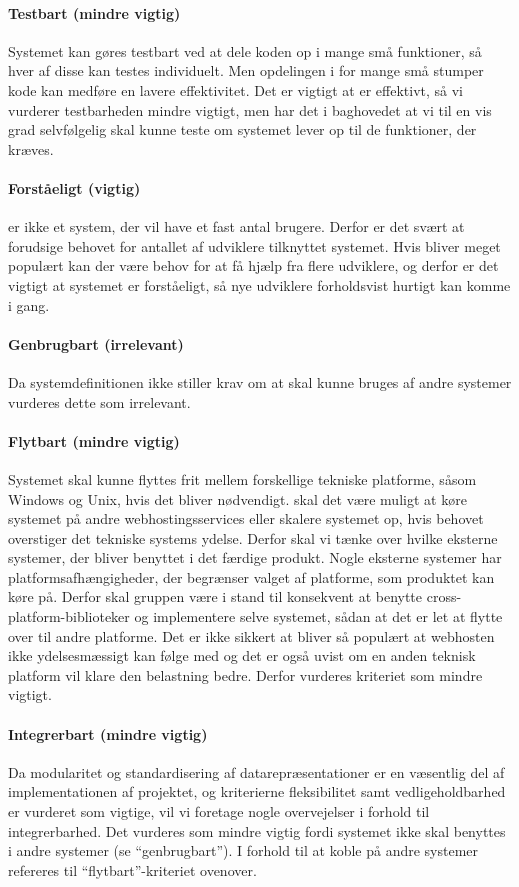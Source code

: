 \paragraph{Testbart (mindre vigtig)} 
Systemet kan gøres testbart ved at dele koden op i mange små funktioner, så hver af disse kan testes individuelt. Men opdelingen i for mange små stumper kode kan medføre en lavere effektivitet. Det er vigtigt at \Foodl{} er effektivt, så vi vurderer testbarheden mindre vigtigt, men har det i baghovedet at vi til en vis grad selvfølgelig skal kunne teste om systemet lever op til de funktioner, der kræves.

\paragraph{Forståeligt (vigtig)} 
\Foodl{} er ikke et system, der vil have et fast antal brugere. Derfor er det svært at forudsige behovet for antallet af udviklere tilknyttet systemet. Hvis \Foodl{} bliver meget populært kan der være behov for at få hjælp fra flere udviklere, og derfor er det vigtigt at systemet er forståeligt, så nye udviklere forholdsvist hurtigt kan komme i gang.

\paragraph{Genbrugbart (irrelevant)} 
Da systemdefinitionen ikke stiller krav om at \Foodl{} skal kunne bruges af andre systemer vurderes dette som irrelevant.

\paragraph{Flytbart (mindre vigtig)} 
Systemet skal kunne flyttes frit mellem forskellige tekniske platforme, såsom Windows og Unix, hvis det bliver nødvendigt. \Fx skal det være muligt at køre systemet på andre webhostingsservices eller skalere systemet op, hvis behovet overstiger det tekniske systems ydelse. Derfor skal vi tænke over hvilke eksterne systemer, der bliver benyttet i det færdige produkt. Nogle eksterne systemer har platformsafhængigheder, der begrænser valget af platforme, som produktet kan køre på. Derfor skal gruppen være i stand til konsekvent at benytte cross-platform-biblioteker og implementere selve systemet, sådan at det er let at flytte over til andre platforme. Det er ikke sikkert at \Foodl{} bliver så populært at webhosten ikke ydelsesmæssigt kan følge med og det er også uvist om en anden teknisk platform vil klare den belastning bedre. Derfor vurderes kriteriet som mindre vigtigt.

\paragraph{Integrerbart (mindre vigtig)} 
Da modularitet og standardisering af datarepræsentationer er en væsentlig del af implementationen af projektet, og kriterierne fleksibilitet samt vedligeholdbarhed er vurderet som vigtige, vil vi foretage nogle overvejelser i forhold til integrerbarhed. Det vurderes som mindre vigtig fordi systemet ikke skal benyttes i andre systemer (se ``genbrugbart''). I forhold til at koble på andre systemer refereres til ``flytbart''-kriteriet ovenover.
